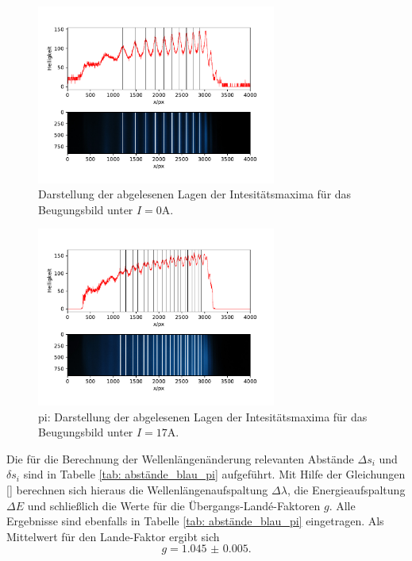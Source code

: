\begin{figure}
  \centering
  \includegraphics[width = 0.7\textwidth]{../Messdaten/plots/peaks_blau_pi_0.pdf}
  \caption{Darstellung der abgelesenen Lagen der Intesitätsmaxima für das Beugungsbild unter $I =0$A.}
  \label{fig: peaks_blau_0}
\end{figure}
\begin{figure}
  \centering
  \includegraphics[width = 0.7\textwidth]{../Messdaten/plots/peaks_blau_pi_17.pdf}
  \caption{pi: Darstellung der abgelesenen Lagen der Intesitätsmaxima für das Beugungsbild unter $I =17$A.}
  \label{fig: peaks_blau_pi_17}
\end{figure}
Die für die Berechnung der Wellenlängenänderung relevanten Abstände $\Delta s_i$ und $\delta s_i$ sind in Tabelle \ref{tab: abstände_blau_pi}
aufgeführt. Mit Hilfe der Gleichungen \eqref{} berechnen sich hieraus die Wellenlängenaufspaltung $\Delta \lambda$, die
Energieaufspaltung $\Delta E$ und schließlich die Werte für die Übergangs-Landé-Faktoren $g$. Alle Ergebnisse sind ebenfalls in
Tabelle \ref{tab: abstände_blau_pi} eingetragen. Als Mittelwert für den Lande-Faktor ergibt sich
\begin{equation}
  g = \num{1.045(5)}.
\end{equation}

